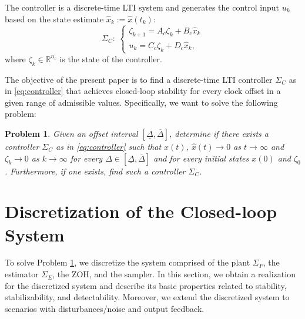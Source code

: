 \documentclass[letterpaper, 12pt, draftcls, onecolumn]{ieeeconf}
\newtheorem{problem}[theorem]{Problem}
\begin{document}
The controller is a discrete-time LTI system and 
generates the control input $u_k$ based on the state estimate $\hat x_k := \hat x(t_k)$:
\begin{equation}
\label{eq:controller}
\Sigma_C:~
\begin{cases}
\zeta_{k+1} = A_c\zeta_{k} + B_c\hat x_k \\
u_k = C_c \zeta_{k} + D_c \hat x_k,
\end{cases}
\end{equation} 
where $\zeta_{k} \in \mathbb{R}^{n_c}$ is the state of the controller.


The objective of the present paper is to find
a discrete-time LTI controller $\Sigma_C$ as in \eqref{eq:controller} 
that achieves closed-loop stability for every
clock offset in a given range of admissible values.
Specifically, we want to solve the following problem:
\begin{problem}
	\label{problem:clockoffset}
	{\it
		Given an offset interval $[\underline \Delta, \overline \Delta]$,
		determine if there exists a controller $\Sigma_C$ as in \eqref{eq:controller} such that
		$x(t)$, $\hat x(t) \to 0$ as $t \to \infty$ and
		$\zeta_{k} \to 0$ as $k \to \infty$ 
		for every $\Delta \in [\underline \Delta, \overline \Delta]$
		and for every initial states $x(0)$ and $\zeta_0$.
		Furthermore, if one exists, find such a controller $\Sigma_C$.
	}
\end{problem}




\section{Discretization of the Closed-loop System}
To solve Problem \ref{problem:clockoffset},
we discretize the system comprised of 
the plant $\Sigma_P$, the estimator $\Sigma_E$, the ZOH, and the sampler.
In this section, we obtain a realization for the discretized system and 
describe its basic properties related to stability, stabilizability, and detectability.
Moreover, we extend the discretized system to scenarios with
disturbances/noise and output feedback.
\end{document}
